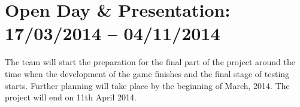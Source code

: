 \section{Open Day \& Presentation: 17/03/2014 -- 04/11/2014}
The team will start the preparation for the final part of the project around the time when the development of the game finishes and the final stage of testing starts. Further planning will take place by the beginning of March, 2014. The project will end on 11th April 2014.